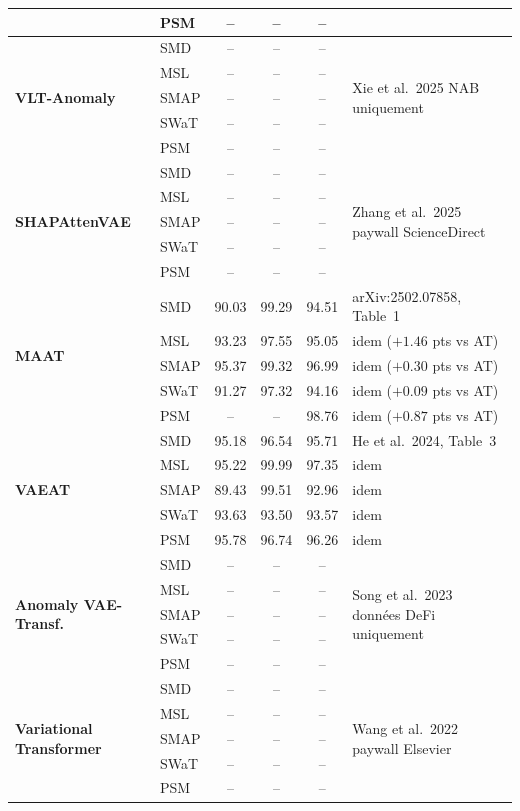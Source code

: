 \documentclass[12pt,a4paper]{article}
\newcommand{\nd}{--}
\begin{document}
\begin{landscape}
\begin{longtable}{llcccl}
 & PSM  & \nd & \nd & \nd & \\
\midrule
\multirow{5}{*}{\textbf{VLT-Anomaly}}
 & SMD  & \nd & \nd & \nd &
   \multirow{5}{*}{Xie et al.\ 2025  NAB uniquement} \\
 & MSL  & \nd & \nd & \nd & \\
 & SMAP & \nd & \nd & \nd & \\
 & SWaT & \nd & \nd & \nd & \\
 & PSM  & \nd & \nd & \nd & \\
\midrule
\multirow{5}{*}{\textbf{SHAPAttenVAE}}
 & SMD  & \nd & \nd & \nd &
   \multirow{5}{*}{Zhang et al.\ 2025  paywall ScienceDirect} \\
 & MSL  & \nd & \nd & \nd & \\
 & SMAP & \nd & \nd & \nd & \\
 & SWaT & \nd & \nd & \nd & \\
 & PSM  & \nd & \nd & \nd & \\
\midrule
\multirow{5}{*}{\textbf{MAAT}}
 & SMD  & 90.03 & 99.29 & 94.51 & arXiv:2502.07858, Table~1 \\
 & MSL  & 93.23 & 97.55 & 95.05 & idem ($+1.46$ pts vs AT) \\
 & SMAP & 95.37 & 99.32 & 96.99 & idem ($+0.30$ pts vs AT) \\
 & SWaT & 91.27 & 97.32 & 94.16 & idem ($+0.09$ pts vs AT) \\
 & PSM  & \nd   & \nd   & 98.76 & idem ($+0.87$ pts vs AT) \\
\midrule
\multirow{5}{*}{\textbf{VAEAT}}
 & SMD  & 95.18 & 96.54 & 95.71 & He et al.\ 2024, Table~3 \\
 & MSL  & 95.22 & 99.99 & 97.35 & idem \\
 & SMAP & 89.43 & 99.51 & 92.96 & idem \\
 & SWaT & 93.63 & 93.50 & 93.57 & idem \\
 & PSM  & 95.78 & 96.74 & 96.26 & idem \\
\midrule
\multirow{5}{*}{\textbf{Anomaly VAE-Transf.}}
 & SMD  & \nd & \nd & \nd &
   \multirow{5}{*}{Song et al.\ 2023  données DeFi uniquement} \\
 & MSL  & \nd & \nd & \nd & \\
 & SMAP & \nd & \nd & \nd & \\
 & SWaT & \nd & \nd & \nd & \\
 & PSM  & \nd & \nd & \nd & \\
\midrule
\multirow{5}{*}{\textbf{Variational Transformer}}
 & SMD  & \nd & \nd & \nd &
   \multirow{5}{*}{Wang et al.\ 2022  paywall Elsevier} \\
 & MSL  & \nd & \nd & \nd & \\
 & SMAP & \nd & \nd & \nd & \\
 & SWaT & \nd & \nd & \nd & \\
 & PSM  & \nd & \nd & \nd & \\
\end{longtable}
\end{landscape}
\end{document}
